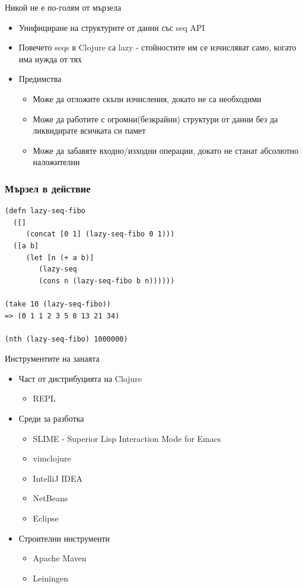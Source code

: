 \documentclass[compress,red]{beamer}
\begin{document}
\begin{frame}{Никой не е по-голям от мързела}
  \transdissolve
  \begin{itemize}
  \item Унифициране на структурите от данни със seq API
  \item Повечето seqs в Clojure са lazy - стойностите им се изчисляват
    само, когато има нужда от тях
  \item Предимства
    \begin{itemize}
    \item Може да отложите скъпи изчисления, докато не са необходими 
    \item Може да работите с огромни(безкрайни) структури от данни без
      да ликвидирате всичката си памет
    \item Може да забавяте входно/изходни операции, докато не станат
      абсолютно наложителни
    \end{itemize}

  \end{itemize}
\end{frame}

\begin{frame}[fragile]
  \frametitle{Мързел в действие}
  \transdissolve
\begin{lstlisting}
(defn lazy-seq-fibo
  ([] 
     (concat [0 1] (lazy-seq-fibo 0 1)))
  ([a b] 
     (let [n (+ a b)]
        (lazy-seq
        (cons n (lazy-seq-fibo b n))))))

(take 10 (lazy-seq-fibo))
=> (0 1 1 2 3 5 8 13 21 34)

(nth (lazy-seq-fibo) 1000000)
\end{lstlisting}
\end{frame}

\begin{frame}{Инструментите на занаята}
  \transdissolve
  \begin{itemize}
  \item Част от дистрибуцията на Clojure
    \begin{itemize}
    \item REPL
    \end{itemize}
  \item Среди за разботка
    \begin{itemize}
    \item SLIME - Superior Lisp Interaction Mode for Emacs
    \item vimclojure
    \item IntelliJ IDEA
    \item NetBeans
    \item Eclipse
    \end{itemize}
  \item Строителни инструменти
    \begin{itemize}
    \item Apache Maven
    \item Leiningen
    \end{itemize}
  \end{itemize}
\end{frame}
\end{document}
